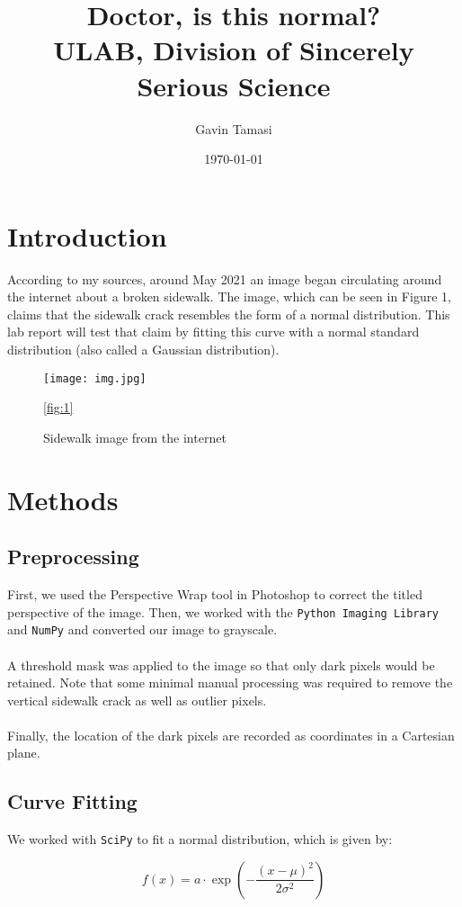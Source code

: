 \documentclass{article}
\title{Doctor, is this normal?\\
\large ULAB, Division of Sincerely Serious Science}
\author{Gavin Tamasi}
\date{\today}
\begin{document}
\maketitle

\section{Introduction}
According to my sources, around May 2021 an image began circulating around the internet about a broken sidewalk. The image, which can be seen in Figure 1, claims that the sidewalk crack resembles the form of a normal distribution. This lab report will test that claim by fitting this curve with a normal standard distribution (also called a Gaussian distribution).
\begin{figure}[h]
    \centering
    \texttt{[image: img.jpg]} 
    \caption{Sidewalk image from the internet}
    \label{fig:1}
    \autoref{fig:1}
\end{figure}

\section{Methods}

\subsection{Preprocessing}
First, we used the Perspective Wrap tool in Photoshop to correct the titled perspective of the image. Then, we worked with the \texttt{Python Imaging Library} and \texttt{NumPy} and converted our image to grayscale. 
\\
\\
A threshold mask was applied to the image so that only dark pixels would be retained. Note that some minimal manual processing was required to remove the vertical sidewalk crack as well as outlier pixels. 
\\
\\
Finally, the location of the dark pixels are recorded as coordinates in a Cartesian plane.

\subsection{Curve Fitting}
We worked with \texttt{SciPy} to fit a normal distribution, which is given by:

\begin{equation}
    f(x) = a \cdot \exp\left( -\frac{(x - \mu)^2}{2 \sigma^2} \right)
\end{equation}
\end{document}
